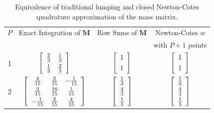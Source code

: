 \begin{table}[!htp]
\centering
\caption{Equivalence of traditional lumping and closed Newton-Cotes quadrature approximation of the mass matrix.}
\begin{tabular}{|c|c|c|c|} 
\hline
  $P$			& Exact Integration of $\mathbf{M}$ 	&  Row Sums of $\mathbf{M}$ &  Newton-Cotes $w$\\
   {}			& 		{}									& 						{} 					&  with $P+1$ points \\
	\hline
				1   	&   
				$ \left[\begin{array}{cc}	\frac{2}{3} & \frac{1}{3} \vspace{3pt}\\  \frac{1}{3} & \frac{2}{3} \end{array}\right] $ & 
				$ \left[ \begin{array}{cc} 1 \vspace{3pt}\\ 1 \end{array} \right]$ & 
				$ \left[ \begin{array}{cc} 1 \vspace{3pt}\\ 1 \end{array} \right]$ \\
					\hline
				2   	&   
				$ \left[\begin{array}{ccc}	\frac{4}{15} & \frac{2}{15} & -\frac{1}{15}\vspace{3pt} \\  
																		\frac{2}{15} & \frac{16}{15} & \frac{1}{15} \vspace{3pt}\\
																		-\frac{1}{15} & \frac{2}{15} & \frac{4}{15}   
				\end{array}\right] $ & 
				$ \left[ \begin{array}{c} \frac{1}{3} \vspace{3pt}\\ \frac{4}{3} \vspace{3pt}\\ \frac{1}{3} \end{array} \right]$ & 
				$ \left[ \begin{array}{c} \frac{1}{3} \vspace{3pt}\\ \frac{4}{3} \vspace{3pt}\\ \frac{1}{3} \end{array} \right]$  \\

\end{tabular}
\end{table}
